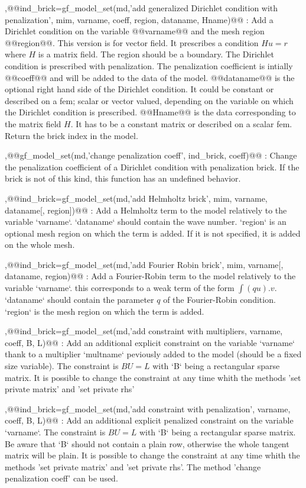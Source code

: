 \begin{cmddescription}
\sep{@@ind_brick=gf_model_set(md,'add  generalized Dirichlet condition with penalization', \tmim mim, \tstr varname, \tscal coeff, \tint region, \tstr dataname, \tstr Hname)@@} :
Add a Dirichlet condition on the variable @@varname@@ and the mesh
region @@region@@. This version is for vector field.
It prescribes a condition $Hu = r$
where $H$ is a matrix field. The region should be a boundary. The Dirichlet
condition is prescribed with penalization. The penalization coefficient
is intially @@coeff@@ and will be added to the data of
the model. @@dataname@@ is the optional
right hand side of  the Dirichlet condition. It could be constant or
described on a fem; scalar or vector valued, depending on the variable
on which the Dirichlet condition is prescribed. @@Hname@@ is the data
    corresponding to the matrix field $H$. It has to be a constant matrix
      or described on a scalar fem. Return the brick index
in the model.

\sep{@@gf_model_set(md,'change penalization coeff', \tint ind_brick, \tscal coeff)@@} :
Change the penalization coefficient of a Dirichlet condition with
penalization brick. If the brick is not of this kind,
this function has an undefined behavior.

\sep{@@ind_brick=gf_model_set(md,'add Helmholtz brick', \tmim mim, \tstr varname, \tstr dataname[, \tint region])@@} :
Add a Helmholtz term to the model relatively to the variable `varname`.
`dataname` should contain the wave number.
`region` is an optional mesh region on which the term is added.
If it is not specified, it is added on the whole mesh.

\sep{@@ind_brick=gf_model_set(md,'add Fourier Robin brick', \tmim mim, \tstr varname[, \tstr dataname, \tint region)@@} :
Add a Fourier-Robin term to the model relatively to the variable
`varname`. this corresponds to a weak term of the form $\int (qu).v$.
`dataname` should contain the parameter $q$ of the Fourier-Robin condition.
`region` is the mesh region on which the term is added.

\sep{@@ind_brick=gf_model_set(md,'add constraint with multipliers,  \tstr varname, \tscal coeff, \tmat B, \tvec L)@@} :
Add an additional explicit constraint on the variable `varname` thank to
a multiplier `multname` peviously added to the model (should be a fixed
size variable).
The constraint is $BU=L$ with `B` being a rectangular sparse matrix.
It is possible to change the constraint
at any time whith the methods 'set private matrix'
and 'set private rhs'

\sep{@@ind_brick=gf_model_set(md,'add constraint with penalization',  \tstr varname, \tscal coeff, \tmat B, \tvec L)@@} :
Add an additional explicit penalized constraint on the variable `varname`.
The constraint is $BU=L$ with `B` being a rectangular sparse matrix.
Be aware that `B` should not contain a plain row, otherwise the whole
tangent matrix will be plain. It is possible to change the constraint
at any time whith the methods 'set private matrix'
and 'set private rhs'. The method 'change penalization coeff' can be used.


\end{cmddescription}
